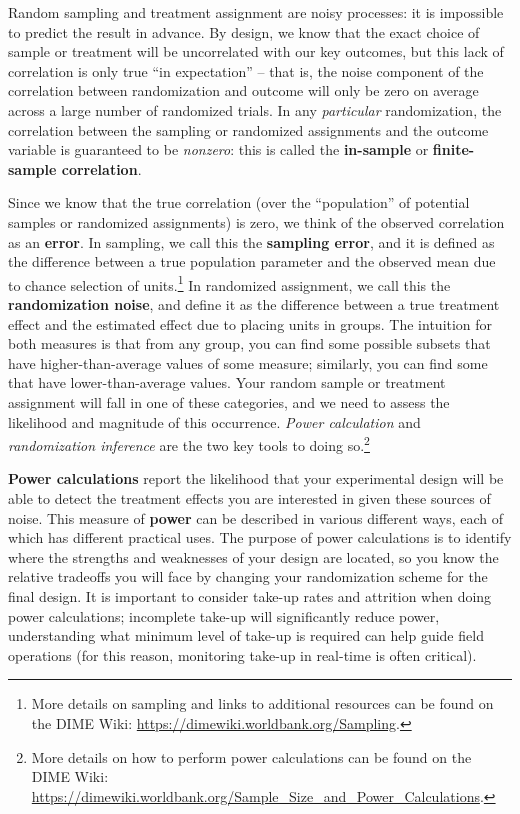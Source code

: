 \documentclass[
]{book}
\begin{document}
Random sampling and treatment assignment are noisy processes:
it is impossible to predict the result in advance.
By design, we know that the exact choice of sample or treatment
will be uncorrelated with our key outcomes,
but this lack of correlation is only true ``in expectation'' --
that is, the noise component of the correlation between randomization and outcome
will only be zero on average across a large number of randomized trials.
In any \emph{particular} randomization,
the correlation between the sampling or randomized assignments and the outcome variable
is guaranteed to be \emph{nonzero}:
this is called the \textbf{in-sample} or \textbf{finite-sample correlation}.

Since we know that the true correlation
(over the ``population'' of potential samples or randomized assignments)
is zero, we think of the observed correlation as an \textbf{error}.
In sampling, we call this the \textbf{sampling error},
and it is defined as the difference between a true population parameter
and the observed mean due to chance selection of units.\footnote{More details on sampling and
  links to additional resources can be found on the DIME Wiki:
  \url{https://dimewiki.worldbank.org/Sampling}.}
In randomized assignment, we call this the \textbf{randomization noise},
and define it as the difference between a true treatment effect
and the estimated effect due to placing units in groups.
The intuition for both measures is that from any group,
you can find some possible subsets that have higher-than-average values of some measure;
similarly, you can find some that have lower-than-average values.
Your random sample or treatment assignment will fall in one of these categories,
and we need to assess the likelihood and magnitude of this occurrence.
\emph{Power calculation} and \emph{randomization inference} are the two key tools to doing so.\footnote{More details on how to perform power calculations
  can be found on the DIME Wiki:
  \url{https://dimewiki.worldbank.org/Sample_Size_and_Power_Calculations}.}

\textbf{Power calculations} report the likelihood that your experimental design
will be able to detect the treatment effects you are interested in
given these sources of noise.
This measure of \textbf{power} can be described in various different ways,
each of which has different practical uses.
The purpose of power calculations is to identify where the strengths and weaknesses
of your design are located, so you know the relative tradeoffs you will face
by changing your randomization scheme for the final design.
It is important to consider take-up rates and attrition when doing power calculations;
incomplete take-up will significantly reduce power,
understanding what minimum level of take-up is required can help guide field operations
(for this reason, monitoring take-up in real-time is often critical).
\end{document}
